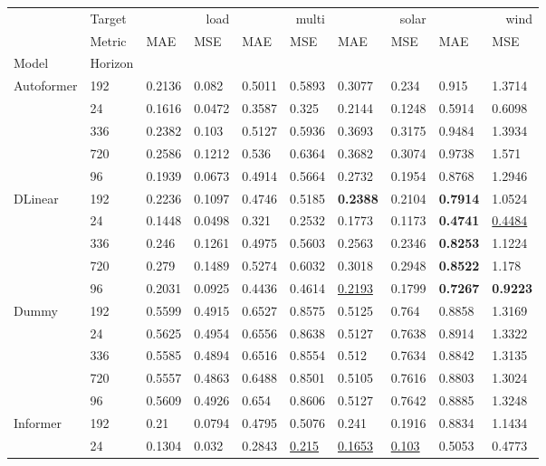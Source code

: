 \begin{tabular}{llllllllll}
\toprule
 & Target & \multicolumn{2}{r}{load} & \multicolumn{2}{r}{multi} & \multicolumn{2}{r}{solar} & \multicolumn{2}{r}{wind} \\
 & Metric & MAE & MSE & MAE & MSE & MAE & MSE & MAE & MSE \\
Model & Horizon &  &  &  &  &  &  &  &  \\
\midrule
\multirow[t]{5}{*}{Autoformer} & 192 & 0.2136 & 0.082 & 0.5011 & 0.5893 & 0.3077 & 0.234 & 0.915 & 1.3714 \\
 & 24 & 0.1616 & 0.0472 & 0.3587 & 0.325 & 0.2144 & 0.1248 & 0.5914 & 0.6098 \\
 & 336 & 0.2382 & 0.103 & 0.5127 & 0.5936 & 0.3693 & 0.3175 & 0.9484 & 1.3934 \\
 & 720 & 0.2586 & 0.1212 & 0.536 & 0.6364 & 0.3682 & 0.3074 & 0.9738 & 1.571 \\
 & 96 & 0.1939 & 0.0673 & 0.4914 & 0.5664 & 0.2732 & 0.1954 & 0.8768 & 1.2946 \\
\cline{1-10}
\multirow[t]{5}{*}{DLinear} & 192 & 0.2236 & 0.1097 & 0.4746 & 0.5185 & \textbf{0.2388} & 0.2104 & \textbf{0.7914} & 1.0524 \\
 & 24 & 0.1448 & 0.0498 & 0.321 & 0.2532 & 0.1773 & 0.1173 & \textbf{0.4741} & \underline{0.4484} \\
 & 336 & 0.246 & 0.1261 & 0.4975 & 0.5603 & 0.2563 & 0.2346 & \textbf{0.8253} & 1.1224 \\
 & 720 & 0.279 & 0.1489 & 0.5274 & 0.6032 & 0.3018 & 0.2948 & \textbf{0.8522} & 1.178 \\
 & 96 & 0.2031 & 0.0925 & 0.4436 & 0.4614 & \underline{0.2193} & 0.1799 & \textbf{0.7267} & \textbf{0.9223} \\
\cline{1-10}
\multirow[t]{5}{*}{Dummy} & 192 & 0.5599 & 0.4915 & 0.6527 & 0.8575 & 0.5125 & 0.764 & 0.8858 & 1.3169 \\
 & 24 & 0.5625 & 0.4954 & 0.6556 & 0.8638 & 0.5127 & 0.7638 & 0.8914 & 1.3322 \\
 & 336 & 0.5585 & 0.4894 & 0.6516 & 0.8554 & 0.512 & 0.7634 & 0.8842 & 1.3135 \\
 & 720 & 0.5557 & 0.4863 & 0.6488 & 0.8501 & 0.5105 & 0.7616 & 0.8803 & 1.3024 \\
 & 96 & 0.5609 & 0.4926 & 0.654 & 0.8606 & 0.5127 & 0.7642 & 0.8885 & 1.3248 \\
\cline{1-10}
\multirow[t]{5}{*}{Informer} & 192 & 0.21 & 0.0794 & 0.4795 & 0.5076 & 0.241 & 0.1916 & 0.8834 & 1.1434 \\
 & 24 & 0.1304 & 0.032 & 0.2843 & \underline{0.215} & \underline{0.1653} & \underline{0.103} & 0.5053 & 0.4773 \\

\end{tabular}
